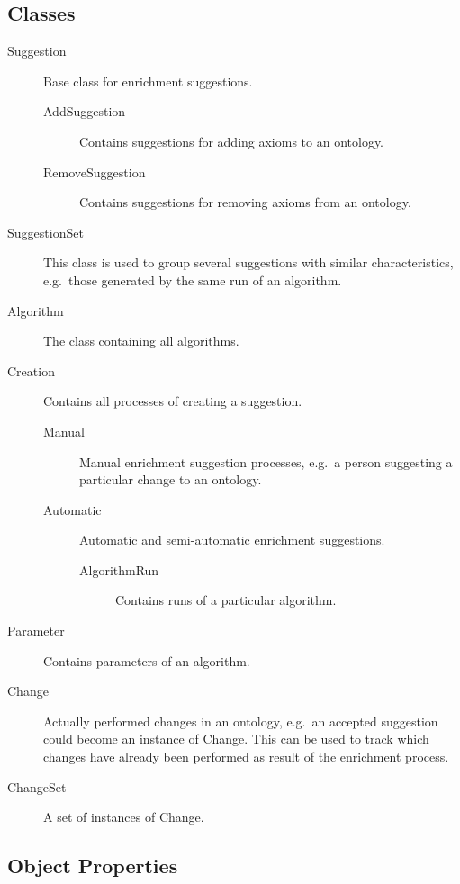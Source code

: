 \documentclass[a4paper,12pt]{scrartcl}
\begin{document}
\subsection*{Classes}

\begin{description}
  \item[Suggestion] Base class for enrichment suggestions.
  \begin{description}
    \item[AddSuggestion] Contains suggestions for adding axioms to an ontology.
    \item[RemoveSuggestion] Contains suggestions for removing axioms from an ontology.
  \end{description}
  \item[SuggestionSet] This class is used to group several suggestions with similar characteristics, e.g.~those generated by the same run of an algorithm.
  \item[Algorithm] The class containing all algorithms.
  \item[Creation] Contains all processes of creating a suggestion.
  \begin{description}
    \item[Manual] Manual enrichment suggestion processes, e.g.~a person suggesting a particular change to an ontology.
    \item[Automatic] Automatic and semi-automatic enrichment suggestions.
    \begin{description}
      \item[AlgorithmRun] Contains runs of a particular algorithm.
    \end{description}
  \end{description}
  \item[Parameter] Contains parameters of an algorithm.
  \item[Change] Actually performed changes in an ontology, e.g.~an accepted suggestion could become an instance of Change. This can be used to track which changes have already been performed as result of the enrichment process.
  \item[ChangeSet] A set of instances of Change.
\end{description}

\subsection*{Object Properties}
\end{document}
